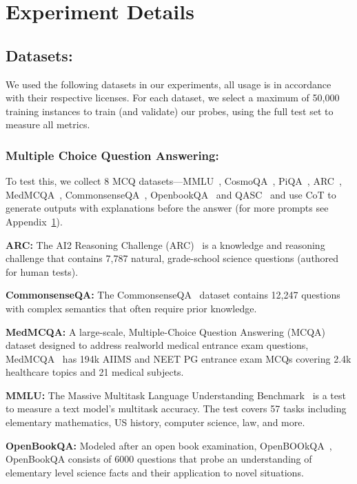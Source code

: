 \section{Experiment Details}
\label{sec:appendix_experiment}

\subsection{Datasets:}
We used the following datasets in our experiments, all usage is in accordance with their respective licenses. For each dataset, we select a maximum of 50,000 training instances to train (and validate) our probes, using the full test set to measure all metrics. 


\subsubsection{Multiple Choice Question Answering:}
To test this, we collect 8 MCQ datasets---MMLU~\citep{hendrycksmeasuring}, CosmoQA~\citep{huang-etal-2019-cosmos}, PiQA~\citep{Bisk2020}, ARC~\citep{allenai:arc}, MedMCQA~\citep{pmlr-v174-pal22a}, CommonsenseQA~\citep{talmor-etal-2019-commonsenseqa}, OpenbookQA~\citep{mihaylov2018can} and QASC~\citep{allenai:qasc} and use CoT to generate outputs with explanations before the answer (for more prompts see Appendix~\ref{sec:appendix_experiment}). 

\noindent\textbf{ARC:} The AI2 Reasoning Challenge (ARC)~\citep{allenai:arc} is a knowledge and reasoning challenge that contains 7,787 natural, grade-school science questions (authored for human tests).

\noindent\textbf{CommonsenseQA:} The CommonsenseQA~\citep{talmor-etal-2019-commonsenseqa} dataset contains 12,247 questions with complex semantics that often require prior knowledge. 

\noindent\textbf{MedMCQA:} A large-scale, Multiple-Choice Question Answering (MCQA) dataset designed to address realworld medical entrance exam questions, MedMCQA~\citep{pmlr-v174-pal22a} has 194k AIIMS and NEET PG entrance exam MCQs covering 2.4k healthcare topics and 21 medical subjects.

\noindent\textbf{MMLU:} The Massive Multitask Language Understanding Benchmark~\citep{hendrycksmeasuring} is a test to measure a text model's multitask accuracy. The test covers 57 tasks including elementary mathematics, US history, computer science, law, and more. 

\noindent\textbf{OpenBookQA:} Modeled after an open book examination, OpenBOOkQA~\citep{mihaylov2018can}, OpenBookQA consists of 6000 questions that probe an understanding of elementary level science facts and their application to novel situations.

